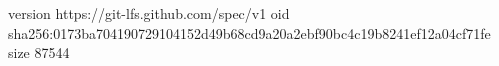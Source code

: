 version https://git-lfs.github.com/spec/v1
oid sha256:0173ba704190729104152d49b68cd9a20a2ebf90bc4c19b8241ef12a04cf71fe
size 87544
